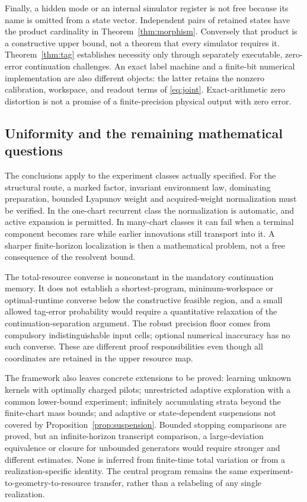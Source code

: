 Finally, a hidden mode or an internal simulator register is not free because its name is omitted from a state vector. Independent pairs of retained states have the product cardinality in Theorem~\ref{thm:morphism}. Conversely that product is a constructive upper bound, not a theorem that every simulator requires it. Theorem~\ref{thm:tag} establishes necessity only through separately executable, zero-error continuation challenges. An exact label machine and a finite-bit numerical implementation are also different objects: the latter retains the nonzero calibration, workspace, and readout terms of \eqref{eq:joint}. Exact-arithmetic zero distortion is not a promise of a finite-precision physical output with zero error.


\subsection{Uniformity and the remaining mathematical questions}
The conclusions apply to the experiment classes actually specified. For the structural route, a marked factor, invariant environment law, dominating preparation, bounded Lyapunov weight and acquired-weight normalization must be verified. In the one-chart recurrent class the normalization is automatic, and active expansion is permitted. In many-chart classes it can fail when a terminal component becomes rare while earlier innovations still transport into it. A sharper finite-horizon localization is then a mathematical problem, not a free consequence of the resolvent bound.

The total-resource converse is nonconstant in the mandatory continuation memory. It does not establish a shortest-program, minimum-workspace or optimal-runtime converse below the constructive feasible region, and a small allowed tag-error probability would require a quantitative relaxation of the continuation-separation argument. The robust precision floor comes from compulsory indistinguishable input cells; optional numerical inaccuracy has no such converse. These are different proof responsibilities even though all coordinates are retained in the upper resource map.

The framework also leaves concrete extensions to be proved: learning unknown kernels with optimally charged pilots; unrestricted adaptive exploration with a common lower-bound experiment; infinitely accumulating strata beyond the finite-chart mass bounds; and adaptive or state-dependent suspensions not covered by Proposition~\ref{prop:suspension}. Bounded stopping comparisons are proved, but an infinite-horizon transcript comparison, a large-deviation equivalence or closure for unbounded generators would require stronger and different estimates. None is inferred from finite-time total variation or from a realization-specific identity. The central program remains the same experiment-to-geometry-to-resource transfer, rather than a relabeling of any single realization.
